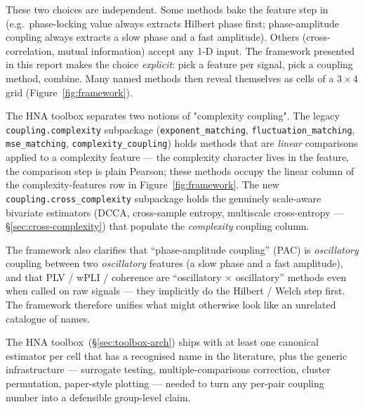 \documentclass[11pt,a4paper]{article}
\begin{document}
These two choices are independent. Some methods bake the feature step
in (e.g.\ phase-locking value always extracts Hilbert phase first;
phase-amplitude coupling always extracts a slow phase and a fast
amplitude). Others (cross-correlation, mutual information) accept any
1-D input. The framework presented in this report makes the choice
\emph{explicit}: pick a feature per signal, pick a coupling method,
combine. Many named methods then reveal themselves as cells of a
\(3 \times 4\) grid (Figure~\ref{fig:framework}).

The HNA toolbox separates two notions of "complexity coupling".
The legacy \texttt{coupling.complexity} subpackage
(\texttt{exponent\_matching}, \texttt{fluctuation\_matching},
\texttt{mse\_matching}, \texttt{complexity\_coupling}) holds methods
that are \emph{linear} comparisons applied to a complexity feature ---
the complexity character lives in the feature, the comparison step is
plain Pearson; these methods occupy the linear column of the
complexity-features row in Figure~\ref{fig:framework}. The new
\texttt{coupling.cross\_complexity} subpackage holds the genuinely
scale-aware bivariate estimators (DCCA, cross-sample entropy,
multiscale cross-entropy --- \S\ref{sec:cross-complexity}) that
populate the \emph{complexity} coupling column.

The framework also clarifies that ``phase-amplitude coupling'' (PAC) is
\emph{oscillatory} coupling between two \emph{oscillatory} features (a
slow phase and a fast amplitude), and that PLV / wPLI / coherence are
``oscillatory $\times$ oscillatory'' methods even when called on raw
signals --- they implicitly do the Hilbert / Welch step first. The
framework therefore unifies what might otherwise look like an unrelated
catalogue of names.

The HNA toolbox~(\S\ref{sec:toolbox-arch}) ships with at least one
canonical estimator per cell that has a recognised name in the
literature, plus the generic infrastructure --- surrogate testing,
multiple-comparisons correction, cluster permutation, paper-style
plotting --- needed to turn any per-pair coupling number into a
defensible group-level claim.
\end{document}
